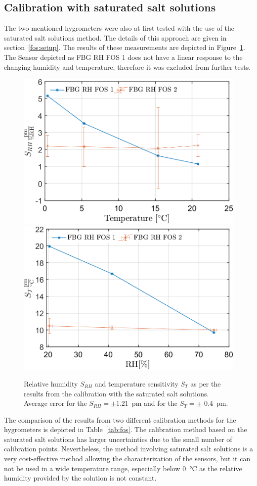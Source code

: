 \subsection{Calibration with saturated salt solutions}
The two mentioned hygrometers were also at first tested with the use of the saturated salt solutions method. The details of this approach are given in section~\ref{fos:setup}. The results of these measurements are depicted in Figure~\ref{fig:fos_salt}. The Sensor depicted as FBG RH FOS 1 does not have a linear response to the changing humidity and temperature, therefore it was excluded from further tests. 

\begin{figure}[!h]
\centering
\includegraphics[width=0.48\columnwidth]{Chapter5/images/salt_srh.png}
\includegraphics[width=0.49\columnwidth]{Chapter5/images/salt_st.png}
\caption{Relative humidity $S_{RH}$ and temperature sensitivity $S_{T}$ as per the results from the calibration with the saturated salt solutions. Average error for the $S_{RH} = \pm $\SI{1.21}{\pico\metre} and for the $S_{T}=\pm$ \SI{0.4}{\pico\metre}.}
\label{fig:fos_salt}
\end{figure}

The comparison of the results from two different calibration methods for the hygrometers is depicted in Table~\ref{tab:fos}. The calibration method based on the saturated salt solutions has larger uncertainties due to the small number of calibration points. Nevertheless, the method involving saturated salt solutions is a very cost-effective method allowing the characterization of the sensors, but it can not be used in a wide temperature range, especially below \SI{0}{\celsius} as the relative humidity provided by the solution is not constant. 

